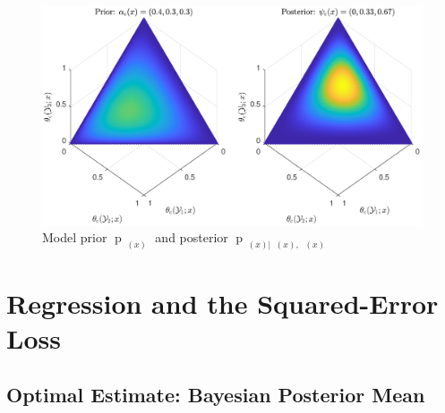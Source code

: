\documentclass{article}
\DeclareMathOperator{\xrm}{\mathrm{x}}
\DeclareMathOperator{\yrm}{\mathrm{y}}
\DeclareMathOperator{\Drm}{\mathrm{D}}
\DeclareMathOperator{\Prm}{\mathrm{P}}
\DeclareMathOperator{\prm}{\mathrm{p}}
\DeclareMathOperator{\upthetac}{\uptheta_\text{c}}
\DeclareMathOperator{\uppsim}{\uppsi_\text{m}}
\DeclareMathOperator{\uppsic}{\uppsi_\text{c}}
\begin{document}
\begin{figure}
	\centering
	\includegraphics[width=1\linewidth]{P_theta_post_SSP.pdf}
	\caption{Model prior $\prm_{\upthetac(x)}$ and posterior $\prm_{\upthetac(x) | \uppsim(x),\uppsic(x)}$}
	\label{fig:P_theta_post_tilde}
\end{figure}



%









\section{Regression and the Squared-Error Loss}



\subsection{Optimal Estimate: Bayesian Posterior Mean}
\end{document}
